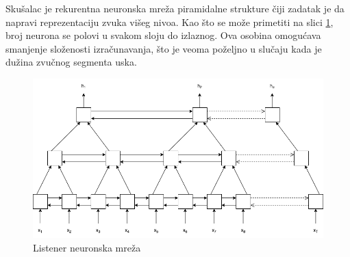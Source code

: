 \documentclass[a4paper]{article}
\begin{document}
Skušalac je rekurentna neuronska mreža piramidalne strukture čiji zadatak je da napravi reprezentaciju zvuka višeg nivoa. 
Kao što se može primetiti na slici \ref{fig:listener_model}, broj neurona se polovi u svakom sloju do izlaznog.
Ova osobina omogućava smanjenje složenosti izračunavanja, što je veoma poželjno u slučaju kada je dužina zvučnog segmenta uska.
\begin{figure}[h!]
  \begin{center}
    \includegraphics[scale=0.3]{listener.png}
  \end{center}
  \caption{Listener neuronska mreža}
  \label{fig:listener_model}
\end{figure}
\end{document}

